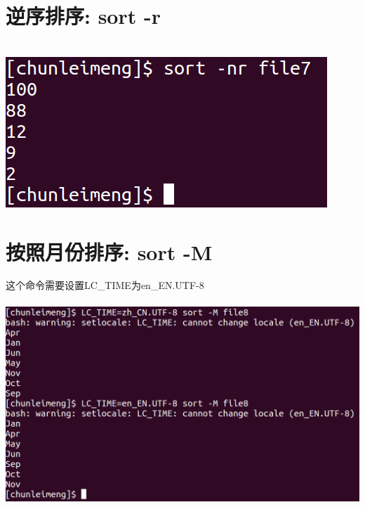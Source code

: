 \documentclass{article}
\begin{document}
\section{逆序排序: sort -r}
~\\
\includegraphics[scale=0.5]{pic3.png} \par

\section{按照月份排序: sort -M}
这个命令需要设置LC\_TIME为en\_EN.UTF-8
~\\
~\\
\includegraphics[scale=0.5]{pic4.png} \par
\end{document}
